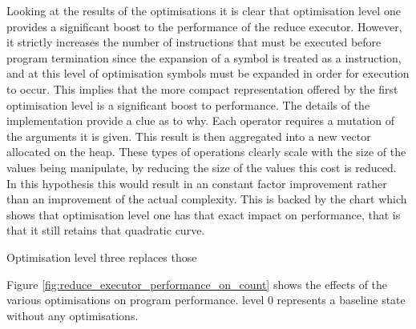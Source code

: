 Looking at the results of the optimisations it is clear that optimisation level one provides a significant boost to the performance of the reduce executor. However, it strictly increases the number of instructions that must be executed before program termination since the expansion of a symbol is treated as a instruction, and at this level of optimisation symbols must be expanded in order for execution to occur. This implies that the more compact representation offered by the first optimisation level is a significant boost to performance. The details of the implementation provide a clue as to why. Each operator requires a mutation of the arguments it is given. This result is then aggregated into a new vector allocated on the heap. These types of operations clearly scale with the size of the values being manipulate, by reducing the size of the values this cost is reduced. In this hypothesis this would result in an constant factor improvement rather than an improvement of the actual complexity. This is backed by the chart which shows that optimisation level one has that exact impact on performance, that is that it still retains that quadratic curve.

Optimisation level three replaces those 




Figure \ref{fig:reduce_executor_performance_on_count} shows the effects of the various optimisations on program performance. level 0 represents a baseline state without any optimisations.




